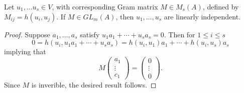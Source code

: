 \documentclass[11pt]{article}
\begin{document}
\begin{lemma}Let $u_1, \dotsc u_s \in V$, with corresponding Gram matrix $M \in M_s(A)$, defined by $M_{ij} = h(u_i, u_j)$.
If $M \in GL_m(A)$, then $u_1, \dotsc, u_s$ are linearly independent.
\end{lemma}
\begin{proof}
Suppose $a_1, \dotsc, a_s$ satisfy $u_1 a_1 + \dotsb + u_sa_s = 0$.
Then for $1 \le i \le s$
\[
0 = h(u_i, u_1 a_1 + \dotsb + u_s a_s) = h(u_i, u_1)a_1 + \dotsb + h(u_i, u_s)a_s
\]
implying that 
\[
M \left( \begin{array}{c}
a_1 \\
\vdots \\
c_1
\end{array} \right)
= \left( \begin{array}{c}
0 \\
\vdots \\
0
\end{array}
\right).
\]
Since $M$ is inverible, the desired result follows.
\end{proof}
\end{document}
